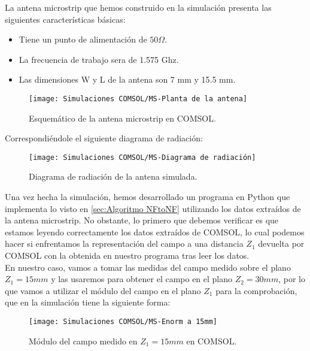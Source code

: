 La antena microstrip que hemos construido en la simulación presenta las siguientes características básicas:

\begin{itemize}
    \item Tiene un punto de alimentación de $50\Omega$.
    \item La frecuencia de trabajo sera de 1.575 Ghz.
    \item Las dimensiones W y L de la antena son 7 mm y 15.5 mm.
\end{itemize}

\begin{figure}[h]
    \centering
    \texttt{[image: Simulaciones COMSOL/MS-Planta de la antena]}
    \caption{Esquemático de la antena microstrip en COMSOL.}
    \label{Simulaciones COMSOL/MS-Planta de la antena}
\end{figure}

\noindent

Correspondiéndole el siguiente diagrama de radiación:

\begin{figure}[h]
  \centering
    \texttt{[image: Simulaciones COMSOL/MS-Diagrama de radiación]}
    \caption{Diagrama de radiación de la antena simulada.}
    \label{MS-Diagrama de radiación de la antena simulada}
\end{figure}

\newpage

Una vez hecha la simulación, hemos desarrollado un programa en Python que implementa lo visto en \ref{sec:Algoritmo NFtoNF} utilizando los datos extraídos de la antena microstrip. No obstante, lo primero que debemos verificar es que estamos leyendo correctamente los datos extraídos de COMSOL, lo cual podemos hacer si enfrentamos la representación del campo a una distancia $Z_1$ devuelta por COMSOL con la obtenida en nuestro programa tras leer los datos.\\

En nuestro caso, vamos a tomar las medidas del campo medido sobre el plano $Z_1=15mm$ y las usaremos para obtener el campo en el plano $Z_2=30mm$, por lo que vamos a utilizar el módulo del campo en el plano $Z_1$ para la comprobación, que en la simulación tiene la siguiente forma:

\begin{figure}[h] 
  \centering
    \texttt{[image: Simulaciones COMSOL/MS-Enorm a 15mm]}
    \caption{Módulo del campo medido en $Z_1=15mm$ en COMSOL.}
    \label{MS-Diagrama de radiación de la antena simulada}
\end{figure}

